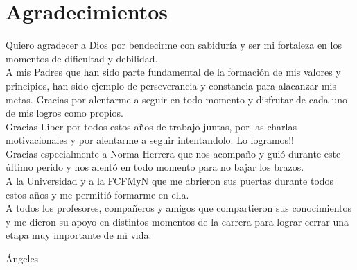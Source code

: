
\chapter*{Agradecimientos}
 
Quiero agradecer a Dios por bendecirme con sabidur\'ia y ser mi fortaleza en los momentos de dificultad y debilidad. \\

A mis Padres que han sido parte fundamental de la formaci\'on de mis valores y principios, han sido ejemplo de perseverancia y constancia para alacanzar mis metas. Gracias por alentarme a seguir en todo momento y disfrutar de cada uno de mis logros como propios.\\

Gracias Liber por todos estos a\~nos de trabajo juntas, por las charlas motivacionales y por alentarme a seguir intentandolo. Lo logramos!!\\

Gracias especialmente a Norma Herrera que nos acompa\~no y gui\'o durante este \'ultimo perido y nos alent\'o en todo momento para no bajar los brazos.\\

A la Universidad y a la FCFMyN que me abrieron sus puertas durante todos estos a\~nos y me permiti\'o formarme en ella. \\

A todos los profesores, compa\~neros y amigos que compartieron sus conocimientos y me dieron su apoyo en distintos momentos de la carrera para lograr cerrar una etapa muy importante de mi vida.\\

\begin{flushright}
\'Angeles
\end{flushright}
